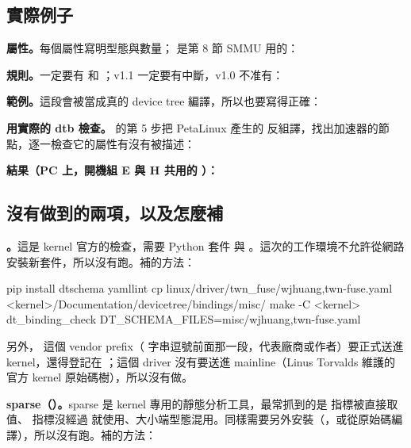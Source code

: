\subsection{實際例子}

\textbf{屬性。}每個屬性寫明型態與數量； 是第 8 節 SMMU 用的：


\textbf{規則。}一定要有  和 ；v1.1 一定要有中斷，v1.0 不准有：


\textbf{範例。}這段會被當成真的 device tree 編譯，所以也要寫得正確：


\textbf{用實際的 dtb 檢查。} 的第 5 步把 PetaLinux 產生的  反組譯，找出加速器的節點，逐一檢查它的屬性有沒有被描述：


\textbf{結果（PC 上，開機組 E 與 H 共用的 ）：}


\subsection{沒有做到的兩項，以及怎麼補}

\textbf{。}這是 kernel 官方的檢查，需要 Python 套件  與 。這次的工作環境不允許從網路安裝新套件，所以沒有跑。補的方法：

\begin{cmdline}
pip install dtschema yamllint
cp linux/driver/twn_fuse/wjhuang,twn-fuse.yaml <kernel>/Documentation/devicetree/bindings/misc/
make -C <kernel> dt_binding_check DT_SCHEMA_FILES=misc/wjhuang,twn-fuse.yaml
\end{cmdline}

另外， 這個 vendor prefix（ 字串逗號前面那一段，代表廠商或作者）要正式送進 kernel，還得登記在 ；這個 driver 沒有要送進 mainline（Linus Torvalds 維護的官方 kernel 原始碼樹），所以沒有做。

\textbf{sparse（）。}sparse 是 kernel 專用的靜態分析工具，最常抓到的是  指標被直接取值、 指標沒經過  就使用、大小端型態混用。同樣需要另外安裝（，或從原始碼編譯），所以沒有跑。補的方法：

